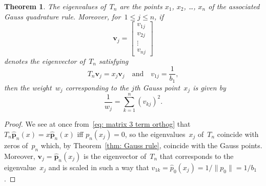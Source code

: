 \documentclass[12pt,a4paper]{article}
\newtheorem{theorem}{Theorem}
\newcommand{\hatvecp}{\hat{\boldsymbol{p}}}
\begin{document}
\begin{theorem}\label{thm: Jacobi eigenproblem}
The eigenvalues of~$T_n$ are the points $x_1$, $x_2$, \dots, $x_n$
of the associated Gauss quadrature rule.  Moreover, for~$1\le j\le n$,
if
\[
\boldsymbol{v}_j=\begin{bmatrix}v_{1j}\\ v_{2j}\\ \vdots\\ v_{nj}
\end{bmatrix}
\]
denotes the eigenvector of~$T_n$ satisfying
\[
T_n\boldsymbol{v}_j=x_j\boldsymbol{v}_j
\quad\text{and}\quad
v_{1j}=\frac{1}{b_1},
\]
then the weight~$w_j$ corresponding to the $j$th Gauss point~$x_j$ 
is given by
\[
\frac{1}{w_j}=\sum_{k=1}^n(v_{kj})^2.
\]
\end{theorem}
\begin{proof}
We see at once from~\eqref{eq: matrix 3 term orthog} that 
$T_n\hatvecp_n(x)=x\hatvecp_n(x)$ iff $p_n(x_j)=0$, so the
eigenvalues~$x_j$ of~$T_n$ coincide with zeros of~$p_n$ which,
by Theorem~\ref{thm: Gauss rule}, coincide with the Gauss points.  
Moreover, $\boldsymbol{v}_j=\hatvecp_n(x_j)$ is the eigenvector 
of~$T_n$ that corresponds to the eigenvalue~$x_j$ and is scaled in 
such a way that $v_{1k}=\hat p_0(x_j)=1/\|p_0\|=1/b_1$.


\end{proof}
\end{document}

